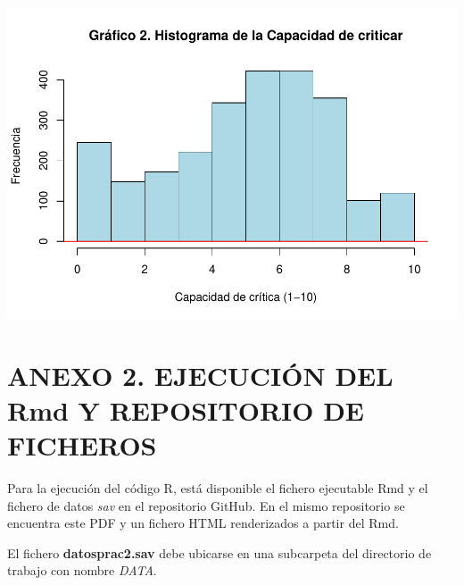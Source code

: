\documentclass[
  12 pt,
  a4paper,
]{article}
\begin{document}
\includegraphics{libertadesItalia2022_files/figure-latex/histograma-1.pdf}

\newpage

\section{ANEXO 2. EJECUCIÓN DEL Rmd Y REPOSITORIO DE
FICHEROS}\label{anexo-2.-ejecuciuxf3n-del-rmd-y-repositorio-de-ficheros}

Para la ejecución del código R, está disponible el fichero ejecutable
Rmd y el fichero de datos \emph{sav} en el repositorio GitHub. En el
mismo repositorio se encuentra este PDF y un fichero HTML renderizados a
partir del Rmd.

El fichero \textbf{datosprac2.sav} debe ubicarse en una subcarpeta del
directorio de trabajo con nombre \emph{DATA}.
\end{document}
